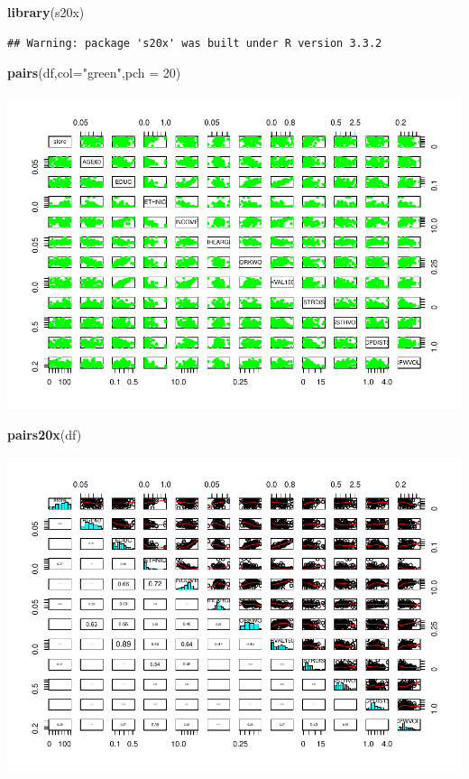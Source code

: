 \documentclass[]{article}
\newenvironment{Shaded}{\begin{snugshade}}{\end{snugshade}}
\newcommand{\KeywordTok}[1]{\textcolor[rgb]{0.13,0.29,0.53}{\textbf{{#1}}}}
\newcommand{\DataTypeTok}[1]{\textcolor[rgb]{0.13,0.29,0.53}{{#1}}}
\newcommand{\DecValTok}[1]{\textcolor[rgb]{0.00,0.00,0.81}{{#1}}}
\newcommand{\StringTok}[1]{\textcolor[rgb]{0.31,0.60,0.02}{{#1}}}
\newcommand{\NormalTok}[1]{{#1}}
\begin{document}
\begin{Shaded}
\begin{Highlighting}[]
\KeywordTok{library}\NormalTok{(s20x)}
\end{Highlighting}
\end{Shaded}

\begin{verbatim}
## Warning: package 's20x' was built under R version 3.3.2
\end{verbatim}

\begin{Shaded}
\begin{Highlighting}[]
\KeywordTok{pairs}\NormalTok{(df,}\DataTypeTok{col=}\StringTok{"green"}\NormalTok{,}\DataTypeTok{pch =} \DecValTok{20}\NormalTok{)}
\end{Highlighting}
\end{Shaded}

\includegraphics{Desc_stats_files/figure-latex/unnamed-chunk-3-1.pdf}

\begin{Shaded}
\begin{Highlighting}[]
\KeywordTok{pairs20x}\NormalTok{(df)}
\end{Highlighting}
\end{Shaded}

\includegraphics{Desc_stats_files/figure-latex/unnamed-chunk-3-2.pdf}
\end{document}
